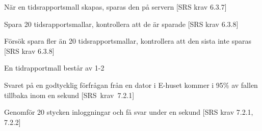\documentclass[a4paper]{article}
\begin{document}
\begin{appendices}
\begin{ST}
\item
När en tidsrapportsmall skapas, sparas den på servern [SRS krav 6.3.7]

\item
Spara 20 tidsrapportsmallar, kontrollera att de är sparade [SRS krav 6.3.8]

\item
Försök spara fler än 20 tidsrapportsmallar, kontrollera att den sista inte sparas [SRS krav 6.3.8]

\item
En tidrapportmall består av 1-2


\item
Svaret på en godtycklig förfrågan från en dator i E-huset kommer i 95\% av fallen tillbaka inom en sekund [SRS~krav~7.2.1]

\item
Genomför 20 stycken inloggningar och få svar under en sekund [SRS krav 7.2.1, 7.2.2]

\end{ST}




\end{appendices}

\newpage
\end{document}
